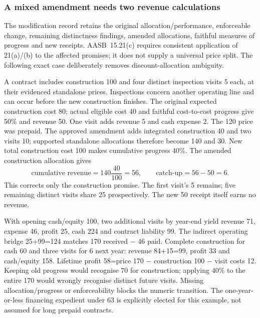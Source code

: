 \hypertarget{a-mixed-amendment-needs-two-revenue-calculations}{%
\subsubsection{A mixed amendment needs two revenue calculations}\label{a-mixed-amendment-needs-two-revenue-calculations}}

The modification record retains the original allocation/performance, enforceable change, remaining distinctness findings, amended allocations, faithful measures of progress and new receipts. AASB~15.21(c) \citep[paras.~18--21,39--45,73--90]{aasb15dated} requires consistent application of 21(a)/(b) to the affected promises; it does not supply a universal price split. The following exact case deliberately removes discount-allocation ambiguity.

A contract includes construction 100 and four distinct inspection visits 5 each, at their evidenced standalone prices. Inspections concern another operating line and can occur before the new construction finishes. The original expected construction cost 80; actual eligible cost 40 and faithful cost-to-cost progress give 50\% and revenue 50. One visit adds revenue 5 and cash expense 2. The 120 price was prepaid. The approved amendment adds integrated construction 40 and two visits 10; supported standalone allocations therefore become 140 and 30. New total construction cost 100 makes cumulative progress 40\%. The amended construction allocation gives
\[\text{cumulative revenue}=140\frac{40}{100}=56,\qquad\text{catch-up}=56-50=6.\]
This corrects only the construction promise. The first visit's 5 remains; five remaining distinct visits share 25 prospectively. The new 50 receipt itself earns no revenue.

With opening cash/equity 100, two additional visits by year-end yield revenue 71, expense 46, profit 25, cash 224 and contract liability 99. The indirect operating bridge 25+99=124 matches 170 received − 46 paid. Complete construction for cash 60 and three visits for 6 next year: revenue 84+15=99, profit 33 and cash/equity 158. Lifetime profit 58=price 170 − construction 100 − visit costs 12. Keeping old progress would recognise 70 for construction; applying 40\% to the entire 170 would wrongly recognise distinct future visits. Missing allocation/progress or enforceability blocks the numeric transition. The one-year-or-less financing expedient under 63 is explicitly elected for this example, not assumed for long prepaid contracts.

